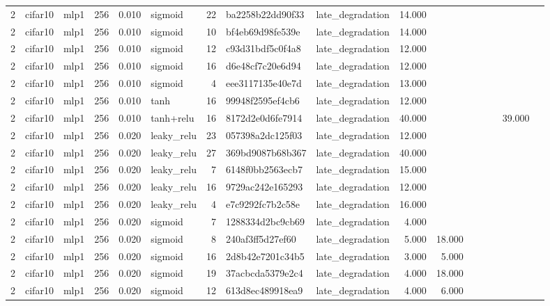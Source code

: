 \begin{table}[htbp]
{\begin{tabular}{@{}rllrrlrllrrrrrrr@{}}
2 & cifar10 & mlp1 & 256 & 0.010 & sigmoid & 22 & ba2258b22dd90f33 & late\_degradation & 14.000 &  &  &  &  &  &  \\
2 & cifar10 & mlp1 & 256 & 0.010 & sigmoid & 10 & bf4eb69d98fe539e & late\_degradation & 14.000 &  &  &  &  &  &  \\
2 & cifar10 & mlp1 & 256 & 0.010 & sigmoid & 12 & c93d31bdf5c0f4a8 & late\_degradation & 12.000 &  &  &  &  &  &  \\
2 & cifar10 & mlp1 & 256 & 0.010 & sigmoid & 16 & d6e48cf7c20e6d94 & late\_degradation & 12.000 &  &  &  &  &  &  \\
2 & cifar10 & mlp1 & 256 & 0.010 & sigmoid & 4 & eee3117135e40e7d & late\_degradation & 13.000 &  &  &  &  &  &  \\
2 & cifar10 & mlp1 & 256 & 0.010 & tanh & 16 & 99948f2595ef4cb6 & late\_degradation & 12.000 &  &  &  &  &  &  \\
2 & cifar10 & mlp1 & 256 & 0.010 & tanh+relu & 16 & 8172d2e0d6fe7914 & late\_degradation & 40.000 &  &  &  &  & 39.000 &  \\
2 & cifar10 & mlp1 & 256 & 0.020 & leaky\_relu & 23 & 057398a2dc125f03 & late\_degradation & 12.000 &  &  &  &  &  &  \\
2 & cifar10 & mlp1 & 256 & 0.020 & leaky\_relu & 27 & 369bd9087b68b367 & late\_degradation & 40.000 &  &  &  &  &  &  \\
2 & cifar10 & mlp1 & 256 & 0.020 & leaky\_relu & 7 & 6148f0bb2563ecb7 & late\_degradation & 15.000 &  &  &  &  &  &  \\
2 & cifar10 & mlp1 & 256 & 0.020 & leaky\_relu & 16 & 9729ac242e165293 & late\_degradation & 12.000 &  &  &  &  &  &  \\
2 & cifar10 & mlp1 & 256 & 0.020 & leaky\_relu & 4 & e7c9292fc7b2c58e & late\_degradation & 16.000 &  &  &  &  &  &  \\
2 & cifar10 & mlp1 & 256 & 0.020 & sigmoid & 7 & 1288334d2bc9cb69 & late\_degradation & 4.000 &  &  &  &  &  &  \\
2 & cifar10 & mlp1 & 256 & 0.020 & sigmoid & 8 & 240af3ff5d27ef60 & late\_degradation & 5.000 & 18.000 &  &  &  &  &  \\
2 & cifar10 & mlp1 & 256 & 0.020 & sigmoid & 16 & 2d8b42e7201c34b5 & late\_degradation & 3.000 & 5.000 &  &  &  &  &  \\
2 & cifar10 & mlp1 & 256 & 0.020 & sigmoid & 19 & 37acbcda5379e2c4 & late\_degradation & 4.000 & 18.000 &  &  &  &  &  \\
2 & cifar10 & mlp1 & 256 & 0.020 & sigmoid & 12 & 613d8ec489918ea9 & late\_degradation & 4.000 & 6.000 &  &  &  &  &  \\

\end{tabular}}
\end{table}

